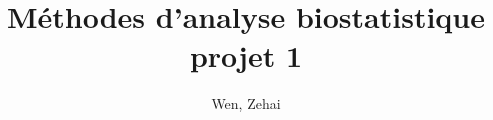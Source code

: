 \documentclass[12pt]{report}
\title{Méthodes d'analyse biostatistique projet 1}
\author{Wen, Zehai }
\date{\DTMnow}
\theoremstyle{plain}
\theoremstyle{definition}
\begin{document}
\begin{CJK*}{UTF8}{gbsn}
\maketitle

\setcounter{tocdepth}{0}










\end{CJK*}
\end{document}
